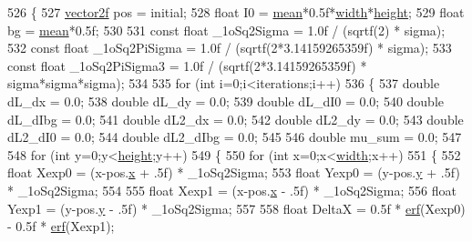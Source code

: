 \begin{DoxyCode}
526 \{
527     \hyperlink{structvector2}{vector2f} pos = initial;
528     \textcolor{keywordtype}{float} I0 = \hyperlink{class_c_p_u_tracker_a611986d18c52010b79815a9cb920b00d}{mean}*0.5f*\hyperlink{class_c_p_u_tracker_afb77fe1c7e1a38d25d5aadded5a36fb9}{width}*\hyperlink{class_c_p_u_tracker_a5d1e01c6a878ff7f0c138f011b0ca5d3}{height};
529     \textcolor{keywordtype}{float} bg = \hyperlink{class_c_p_u_tracker_a611986d18c52010b79815a9cb920b00d}{mean}*0.5f;
530 
531     \textcolor{keyword}{const} \textcolor{keywordtype}{float} \_1oSq2Sigma = 1.0f / (sqrtf(2) * sigma);
532     \textcolor{keyword}{const} \textcolor{keywordtype}{float} \_1oSq2PiSigma = 1.0f / (sqrtf(2*3.14159265359f) * sigma);
533     \textcolor{keyword}{const} \textcolor{keywordtype}{float} \_1oSq2PiSigma3 = 1.0f / (sqrtf(2*3.14159265359f) * sigma*sigma*sigma);
534 
535     \textcolor{keywordflow}{for} (\textcolor{keywordtype}{int} i=0;i<iterations;i++)
536     \{
537         \textcolor{keywordtype}{double} dL\_dx = 0.0; 
538         \textcolor{keywordtype}{double} dL\_dy = 0.0; 
539         \textcolor{keywordtype}{double} dL\_dI0 = 0.0;
540         \textcolor{keywordtype}{double} dL\_dIbg = 0.0;
541         \textcolor{keywordtype}{double} dL2\_dx = 0.0;
542         \textcolor{keywordtype}{double} dL2\_dy = 0.0;
543         \textcolor{keywordtype}{double} dL2\_dI0 = 0.0;
544         \textcolor{keywordtype}{double} dL2\_dIbg = 0.0;
545 
546         \textcolor{keywordtype}{double} mu\_sum = 0.0;
547                 
548         \textcolor{keywordflow}{for} (\textcolor{keywordtype}{int} y=0;y<\hyperlink{class_c_p_u_tracker_a5d1e01c6a878ff7f0c138f011b0ca5d3}{height};y++)
549         \{
550             \textcolor{keywordflow}{for} (\textcolor{keywordtype}{int} x=0;x<\hyperlink{class_c_p_u_tracker_afb77fe1c7e1a38d25d5aadded5a36fb9}{width};x++)
551             \{
552                 \textcolor{keywordtype}{float} Xexp0 = (x-pos.\hyperlink{structvector2_a22b63498d8e4abf9a2da054a247965b9}{x} + .5f) * \_1oSq2Sigma;
553                 \textcolor{keywordtype}{float} Yexp0 = (y-pos.\hyperlink{structvector2_a00b3268bc895adddf0b72d6acd8274a7}{y} + .5f) * \_1oSq2Sigma;
554         
555                 \textcolor{keywordtype}{float} Xexp1 = (x-pos.\hyperlink{structvector2_a22b63498d8e4abf9a2da054a247965b9}{x} - .5f) * \_1oSq2Sigma;
556                 \textcolor{keywordtype}{float} Yexp1 = (y-pos.\hyperlink{structvector2_a00b3268bc895adddf0b72d6acd8274a7}{y} - .5f) * \_1oSq2Sigma;
557                 
558                 \textcolor{keywordtype}{float} DeltaX = 0.5f * \hyperlink{utils_8h_ab395c4718c08b423258c297fe9b1cae8}{erf}(Xexp0) - 0.5f * \hyperlink{utils_8h_ab395c4718c08b423258c297fe9b1cae8}{erf}(Xexp1);

\end{DoxyCode}

